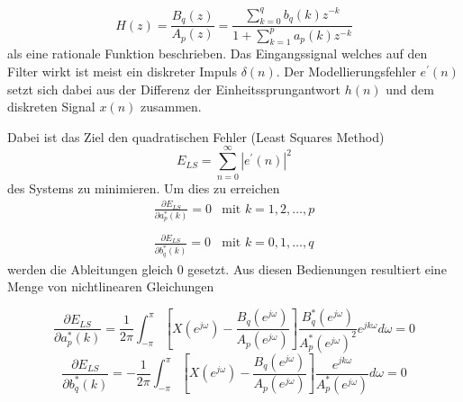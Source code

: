 \begin{equation}
H(z)
=
\frac{B_{q}(z)}{A_{p}(z)}
=
\frac{\sum_{k=0}^{q} b_{q}(k) z^{-k}}{1+\sum_{k=1}^{p} a_{p}(k) z^{-k}}
\end{equation}
als eine rationale Funktion beschrieben.
Das Eingangssignal welches auf den Filter wirkt ist meist ein diskreter Impuls $\delta(n)$.
Der Modellierungsfehler $e^{\prime}(n)$ setzt sich dabei aus der Differenz der Einheitssprungantwort $h(n)$ und dem diskreten Signal $x(n)$ zusammen.
\begin{center}
	\tikzset{>=latex}
\end{center}
Dabei ist das Ziel den quadratischen Fehler (Least Squares Method)
\begin{equation}
E_{L S}
=
\sum_{n=0}^{\infty}\left|e^{\prime}(n)\right|^{2}
\end{equation}
des Systems zu minimieren.
Um dies zu erreichen   
\begin{equation}\begin{array}{ll}
\frac{\partial E_{L S}}{\partial a_{p}^{*}(k)}
=
0 
& 
\text{mit } k=1,2, \ldots, p \\
&\\

\frac{\partial E_{L S}}{\partial b_{q}^{*}(k)}
=
0  
&
 \text{mit } k=0,1, \ldots, q
\end{array}\end{equation}
werden die Ableitungen gleich 0 gesetzt.
Aus diesen Bedienungen resultiert eine Menge von nichtlinearen Gleichungen 

\begin{equation}
\frac{\partial E_{L S}}{\partial a_{p}^{*}(k)}
=
\frac{1}{2 \pi} 
\int_{-\pi}^{\pi}
\left[X\left(e^{j \omega}\right)-\frac{B_{q}\left(e^{j \omega}\right)}{A_{p}\left(e^{j \omega}\right)}\right] 
\frac{B_{q}^{*}\left(e^{j \omega}\right)}{A_{p}^{*}\left(e^{j \omega}\right)^{2}} 
e^{j k \omega} d \omega
=
0
\end{equation}
\begin{equation}
\frac{\partial E_{L S}}{\partial b_{q}^{*}(k)}
=
-\frac{1}{2 \pi} 
\int_{-\pi}^{\pi}
\left[X\left(e^{j \omega}\right)-\frac{B_{q}\left(e^{j \omega}\right)}{A_{p}\left(e^{j \omega}\right)}\right] 
\frac{e^{j k \omega}}{A_{p}^{*}\left(e^{j \omega}\right)} d \omega
=
0
\end{equation}

